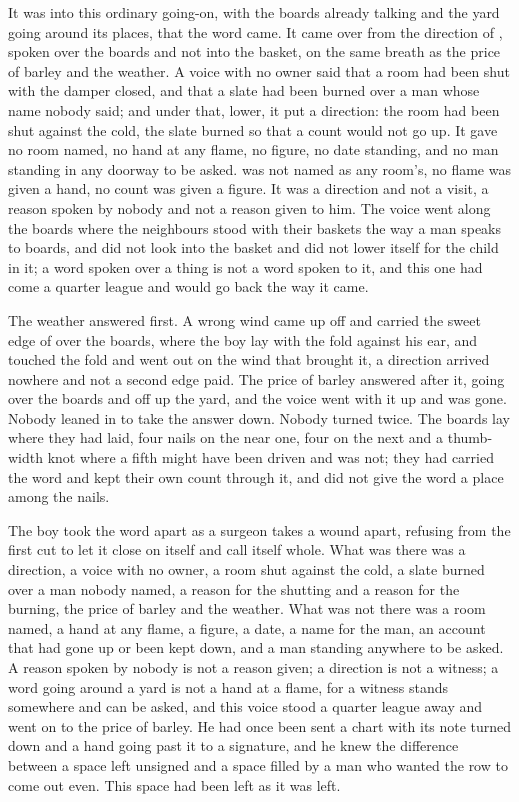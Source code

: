 \scenebreak

It was into this ordinary going-on, with the boards already talking and the yard going around its places, that the word came. It came over  from the direction of , spoken over the boards and not into the basket, on the same breath as the price of barley and the weather. A voice with no owner said that a room had been shut with the damper closed, and that a slate had been burned over a man whose name nobody said; and under that, lower, it put a direction: the room had been shut against the cold, the slate burned so that a count would not go up. It gave no room named, no hand at any flame, no figure, no date standing, and no man standing in any doorway to be asked.  was not named as any room's, no flame was given a hand, no count was given a figure. It was a direction and not a visit, a reason spoken by nobody and not a reason given to him. The voice went along the boards where the neighbours stood with their baskets the way a man speaks to boards, and did not look into the basket and did not lower itself for the child in it; a word spoken over a thing is not a word spoken to it, and this one had come a quarter league and would go back the way it came.

The weather answered first. A wrong wind came up off  and carried the sweet edge of  over the boards, where the boy lay with the fold against his ear, and touched the fold and went out on the wind that brought it, a direction arrived nowhere and not a second edge paid. The price of barley answered after it, going over the boards and off up the yard, and the voice went with it up  and was gone. Nobody leaned in to take the answer down. Nobody turned twice. The boards lay where they had laid, four nails on the near one, four on the next and a thumb-width knot where a fifth might have been driven and was not; they had carried the word and kept their own count through it, and did not give the word a place among the nails.

The boy took the word apart as a surgeon takes a wound apart, refusing from the first cut to let it close on itself and call itself whole. What was there was a direction, a voice with no owner, a room shut against the cold, a slate burned over a man nobody named, a reason for the shutting and a reason for the burning, the price of barley and the weather. What was not there was a room named, a hand at any flame, a figure, a date, a name for the man, an account that had gone up or been kept down, and a man standing anywhere to be asked. A reason spoken by nobody is not a reason given; a direction is not a witness; a word going around a yard is not a hand at a flame, for a witness stands somewhere and can be asked, and this voice stood a quarter league away and went on to the price of barley. He had once been sent a chart with its note turned down and a hand going past it to a signature, and he knew the difference between a space left unsigned and a space filled by a man who wanted the row to come out even. This space had been left as it was left.

